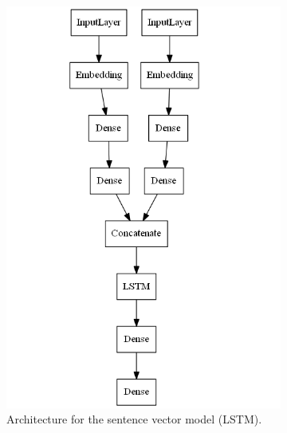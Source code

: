 \documentclass[acmsmall,nonacm]{acmart}
\begin{document}
\begin{figure}[h!]
  \begin{subfigure}[c]{0.35\textwidth}
    \includegraphics[width=\textwidth]{assets/lstm_model.png}
  \caption{Architecture for the sentence vector model (LSTM).}
  \label{fig:lstm_model}
  \end{subfigure}
  \hfill
  \begin{subfigure}[c]{0.35\textwidth}

\end{subfigure}
\end{figure}
\end{document}
